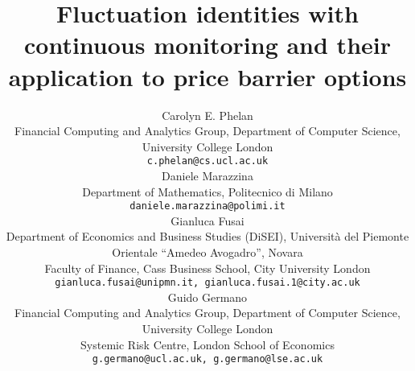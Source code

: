 \documentclass[11pt,a4paper]{article}
\begin{document}

\title{Fluctuation identities with continuous monitoring and their application to price barrier options}

%
%
%
\author{Carolyn E. Phelan

Financial Computing and Analytics Group, Department of Computer Science, University College London

\texttt{c.phelan@cs.ucl.ac.uk}

\bigskip

Daniele Marazzina

Department of Mathematics, Politecnico di Milano

\texttt{daniele.marazzina@polimi.it}

\bigskip

Gianluca Fusai

Department of Economics and Business Studies (DiSEI), Universit\`a del Piemonte Orientale ``Amedeo Avogadro'', Novara\\ Faculty of Finance, Cass Business School, City University London

\texttt{gianluca.fusai@unipmn.it, gianluca.fusai.1@city.ac.uk}

\bigskip

Guido Germano

Financial Computing and Analytics Group, Department of Computer Science, University College London\\ Systemic Risk Centre, London School of Economics

\texttt{g.germano@ucl.ac.uk, g.germano@lse.ac.uk}
}
\end{document}

